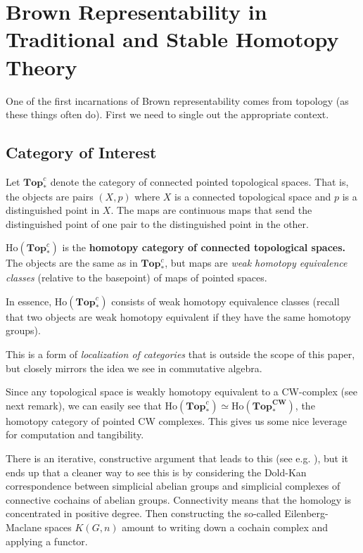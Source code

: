 \documentclass[12pt]{article}
\newcommand*{\pTopc}{\mathbf{Top}_\ast^c}
\newcommand*{\pCW}{\mathbf{Top}^{CW}_\ast}
\begin{document}
\section{Brown Representability in Traditional and Stable Homotopy Theory}
One of the first incarnations of Brown representability comes from topology (as these things often do). First we need to single out 
the appropriate context.

\subsection{Category of Interest}
\begin{defn}
	Let $\pTopc$ denote the category of connected pointed topological spaces. That is, the objects are pairs $(X,p)$ where $X$ is a connected 
	topological space and $p$ is a distinguished point in $X$. The maps are continuous maps that send the distinguished point of one pair to the distinguished point in the other.
\end{defn}
\begin{defn}
	$\text{Ho}(\pTopc)$ is the \textbf{homotopy category of connected topological spaces.} The objects are the same as in $\pTopc$, 
	but maps are \textit{weak homotopy equivalence classes} (relative to the basepoint) of maps of pointed spaces.
\end{defn}
\begin{rmk}
	In essence, $\text{Ho}(\pTopc)$ consists of weak homotopy equivalence classes (recall that two objects are weak homotopy equivalent if they have the same 
	homotopy groups).
\end{rmk}
\begin{rmk}
	This is a form of \textit{localization of categories} that is outside the scope of this paper, but closely mirrors the idea 
	we see in commutative algebra.
\end{rmk}
\begin{rmk}
	Since any topological space is weakly homotopy equivalent to a CW-complex (see next remark), we can easily see that 
	$\text{Ho}(\pTopc)\simeq\text{Ho}(\mathbf{\pCW})$, the homotopy category of pointed CW complexes. This gives us some nice leverage for computation and tangibility.
\end{rmk}
\begin{rmk}
	There is an iterative, constructive argument that leads to this (see e.g. \cite{hatcher}), but it ends up that 
	a cleaner way to see this is by considering the Dold-Kan correspondence between simplicial 
	abelian groups and simplicial complexes of connective cochains of abelian groups. Connectivity means that the homology is concentrated in positive degree. 
	Then constructing the so-called Eilenberg-Maclane spaces $K(G,n)$ amount to writing down a cochain complex and applying a functor.
\end{rmk}
\end{document}
